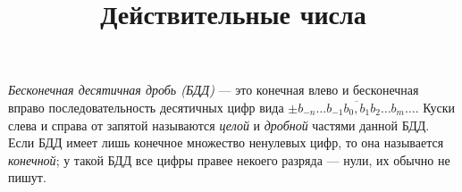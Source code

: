 \documentclass[a4paper, 12pt, num=26]{listok}
\begin{document}
\title{Действительные числа}
\maketitle{}
\begin{definition}
	\textit{Бесконечная десятичная дробь (БДД)} --- это конечная влево и бесконечная вправо последовательность десятичных цифр вида
	$\pm\overline{b_{-n}\ldots b_{-1}b_0{,}b_1b_2\ldots b_m\ldots}$.
	Куски слева и справа от запятой называются \textit{целой} и \textit{дробной} частями данной БДД.
	Если БДД имеет лишь конечное множество ненулевых цифр, то она называется \textit{конечной};
	у такой БДД все цифры правее некоего разряда --- нули, их обычно не пишут.
\end{definition}
\end{document}
